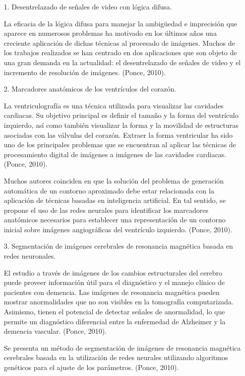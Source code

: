\begin{itemize}
\item[1.]Desentrelazado de señales de video con lógica difusa.

La eficacia de la lógica difusa para manejar la ambigüedad e imprecisión que aparece en numerosos problemas ha motivado en los últimos años una creciente aplicación de dichas técnicas al procesado de imágenes. Muchos de los trabajos realizados se han centrado en dos aplicaciones que son objeto de una gran demanda en la actualidad: el desentrelazado de señales de video y el incremento de resolución de imágenes. (Ponce, 2010).

\item[2.]Marcadores anatómicos de los ventrículos del corazón.

La ventriculografía es una técnica utilizada para visualizar las cavidades cardiacas. Su objetivo principal es definir el tamaño y la forma del ventrículo izquierdo, así como también visualizar la forma y la movilidad de estructuras asociadas con las válvulas del corazón. Extraer la forma ventricular ha sido uno de los principales problemas que se encuentran al aplicar las técnicas de procesamiento digital de imágenes a imágenes de las cavidades cardiacas. (Ponce, 2010).

Muchos autores coinciden en que la solución del problema de generación automática de un contorno aproximado debe estar relacionada con la aplicación de técnicas basadas en inteligencia artificial. En tal sentido, se propone el uso de las redes neurales para identificar los marcadores anatómicos necesarios para establecer una representación de un contorno inicial sobre imágenes angiográficas del ventrículo izquierdo. (Ponce, 2010).

\item[3.]Segmentación de imágenes cerebrales de resonancia magnética basada en redes neuronales.

El estudio a través de imágenes de los cambios estructurales del cerebro puede proveer información útil para el diagnóstico y el manejo clínico de pacientes con demencia. Las imágenes de resonancia magnética pueden mostrar anormalidades que no son visibles en la tomografía computarizada. Asimismo, tienen el potencial de detectar señales de anormalidad, lo que permite un diagnóstico diferencial entre la enfermedad de Alzheimer y la demencia vascular. (Ponce, 2010).

Se presenta un método de segmentación de imágenes de resonancia magnética cerebrales basada en la utilización de redes neurales utilizando algoritmos genéticos para el ajuste de los parámetros. (Ponce, 2010).


\end{itemize}
